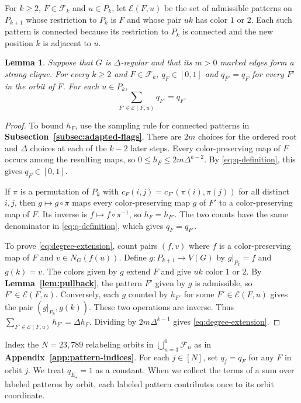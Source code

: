 \documentclass[preprint,11pt,numbers]{elsarticle-arxiv}
\numberwithin{equation}{section}
\newtheorem{lemma}[theorem]{Lemma}
\theoremstyle{definition}
\begin{document}
For $k\geq2$, $F\in\mathcal F_k$ and $u\in P_k$, let
$\mathcal E(F,u)$ be the set of admissible patterns on $P_{k+1}$ whose
restriction to $P_k$ is $F$ and whose pair $uk$ has color $1$ or $2$.
Each such pattern is connected because its restriction to $P_k$ is
connected and the new position $k$ is adjacent to $u$.

\begin{lemma}\label{lem:coordinates}\label{lem:degree}
Suppose that $G$ is $\Delta$-regular and that its $m>0$ marked edges
form a strong clique. For every $k\geq2$ and $F\in\mathcal F_k$,
$q_F\in[0,1]$ and $q_{F'}=q_F$ for every $F'$ in the orbit of $F$.
For each $u\in P_k$,
\begin{equation}\label{eq:degree-extension}
 \sum_{F'\in\mathcal E(F,u)}q_{F'}=q_F.
\end{equation}
\end{lemma}

\begin{proof}
To bound $h_F$, use the sampling rule for connected patterns in
\textbf{Subsection~\ref{subsec:adapted-flags}}. There are $2m$
choices for the ordered root and $\Delta$ choices at each of the
$k-2$ later steps. Every color-preserving map of $F$ occurs among
the resulting maps, so $0\leq h_F\leq2m\Delta^{k-2}$. By
\eqref{eq:q-definition}, this gives $q_F\in[0,1]$.

If $\pi$ is a permutation of $P_k$ with
$c_F(i,j)=c_{F'}(\pi(i),\pi(j))$ for all distinct $i,j$, then
$g\mapsto g\circ\pi$ maps every color-preserving map $g$ of $F'$
to a color-preserving map of $F$. Its inverse is
$f\mapsto f\circ\pi^{-1}$, so
$h_F=h_{F'}$. The two counts have the same denominator in
\eqref{eq:q-definition}, which gives $q_F=q_{F'}$.

To prove \eqref{eq:degree-extension}, count pairs $(f,v)$ where $f$
is a color-preserving map of $F$ and $v\in N_G(f(u))$. Define
$g\colon P_{k+1}\to V(G)$ by $g|_{P_k}=f$ and $g(k)=v$. The
colors given by $g$ extend $F$ and give $uk$ color $1$ or $2$.
By \textbf{Lemma~\ref{lem:pullback}}, the pattern $F'$ given by $g$
is admissible, so $F'\in\mathcal E(F,u)$. Conversely, each $g$
counted by $h_{F'}$ for some $F'\in\mathcal E(F,u)$ gives the
pair $(g|_{P_k},g(k))$. These two operations are inverse. Thus
$\sum_{F'\in\mathcal E(F,u)}h_{F'}=\Delta h_F$.
Dividing by $2m\Delta^{k-1}$ gives \eqref{eq:degree-extension}.
\end{proof}

Index the $N=23{,}789$ relabeling orbits in
$\bigcup_{n=3}^6\mathcal F_n$ as in \textbf{Appendix~\ref{app:pattern-indices}}.
For each $j\in[N]$, set $q_j=q_F$ for any $F$ in orbit $j$.
We treat $q_{E_\star}=1$ as a constant. When we collect the terms of a
sum over labeled patterns by orbit, each labeled pattern contributes
once to its orbit coordinate.
\end{document}
